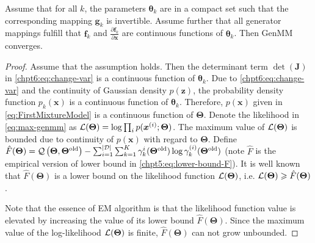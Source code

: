 \begin{proposition}
  Assume that for all $k$, the parameters $\bm{\theta}_k$ are in a compact set such that the corresponding mapping $\bm{g}_k$ is invertible. Assume further that all generator mappings fulfill that $\bm{f}_k$ and $\frac{\partial \bm{f}_k}{\partial \bm{x}}$ are continuous functions of $\bm{\theta}_k$. Then GenMM converges. 
\end{proposition}
\begin{proof}
  Assume that the assumption holds. Then the determinant term $\det(\bm{J})$ in \eqref{chpt6:eq:change-var} is a continuous function of $\bm{\theta}_k$. Due to \eqref{chpt6:eq:change-var} and the continuity of Gaussian density $p(\bm{z})$, the probability density function $p_k(\bm{x})$ is a continuous function of $\bm{\theta}_k$. Therefore, $p(\bm{x})$ given in \eqref{eq:FirstMixtureModel} is a continuous function of $\bm{\Theta}$. Denote the likelihood in \eqref{eq:max-genmm} as $\mathcal{L}(\bm{\Theta})=\log \textstyle\prod_{i} p(\bm{x}^{(i)};\bm{\Theta})$. The maximum value of $\mathcal{L}(\bm{\Theta})$ is bounded due to continuity of $p(\bm{x})$ with regard to $\bm{\Theta}$.
  Define $\hat{F}(\bm{\Theta}) = \mathcal{Q}\left(\bm{\Theta},\bm{\Theta}^{\mathrm{old}}\right) - \sum_{i=1}^{| \mathcal{D} |}\sum_{k=1}^{K}\gamma_k^{i}(\bm{\Theta}^{\mathrm{old}}) \log\gamma_k^{(i)}(\bm{\Theta}^{\mathrm{old}})$ (note $\hat{F}$ is the empirical version of lower bound in \eqref{chpt5:eq:lower-bound-F}). It is well known that $\hat{F}(\bm{\Theta})$ is a lower bound on the likelihood function $\mathcal{L}(\bm{\Theta})$, i.e. $\mathcal{L}(\bm{\Theta}) \geqslant \hat{F}(\bm{\Theta})$.

  Note that the essence of EM algorithm is that the likelihood function value is elevated by increasing the value of its lower bound $\hat{F}(\bm{\Theta})$. Since the maximum value of the log-likelihood $\mathcal{L}(\bm{\Theta})$ is finite, $\hat{F}(\bm{\Theta})$ can not grow unbounded.

\end{proof}



